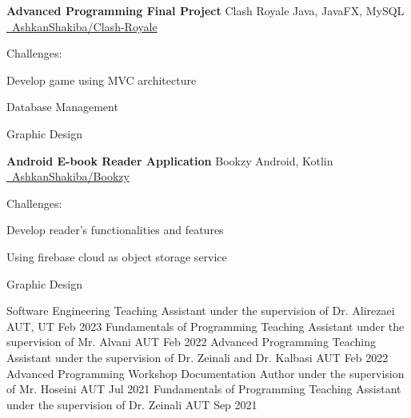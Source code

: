 \documentclass[]{awesome-cv}
\begin{document}
\begin{cventries}
	\vspace{0mm}
	\cventry
	{\textbf{Advanced Programming Final Project}}
	{Clash Royale}
	{Java, JavaFX, MySQL}
	{\href{https://github.com/AshkanShakiba/Clash-Royale}{\faGithub\ AshkanShakiba/Clash-Royale}}
	{\begin{cvitems}
		\vspace{1mm}
		\item[] {\hspace{-9mm} Challenges:}
		\vspace{1mm}
		\item {Develop game using MVC architecture}
		\vspace{1mm}
		\item {Database Management}
		\vspace{1mm}
		\item {Graphic Design}
	\end{cvitems}}
	\vspace{0mm}
	\cventry
	{\textbf{Android E-book Reader Application}}
	{Bookzy}
	{Android, Kotlin}
	{\href{https://github.com/maryam-kermanshahani2001/Bookzy}{\faGithub\ AshkanShakiba/Bookzy}}
	{\begin{cvitems}
		\vspace{1mm}
		\item[] {\hspace{-9mm} Challenges:}
		\vspace{1mm}
		\item {Develop reader's functionalities and features}
		\vspace{1mm}
		\item {Using firebase cloud as object storage service}
		\vspace{1mm}
		\item {Graphic Design}
	\end{cvitems}}
	\vspace{-3mm}
\end{cventries}
\vspace{2mm}
\begin{cvhonors}
	\cvhonor
	{Software Engineering}
	{Teaching Assistant under the supervision of Dr. Alirezaei}
	{AUT, UT}
	{Feb 2023}
	\cvhonor
	{Fundamentals of Programming}
	{Teaching Assistant under the supervision of Mr. Alvani}
	{AUT}
	{Feb 2022}
	\cvhonor
	{Advanced Programming}
	{Teaching Assistant under the supervision of Dr. Zeinali and Dr. Kalbasi}
	{AUT}
	{Feb 2022}
	\cvhonor
	{Advanced Programming}
	{Workshop Documentation Author under the supervision of Mr. Hoseini}
	{AUT}
	{Jul 2021}
	\cvhonor
	{Fundamentals of Programming}
	{Teaching Assistant under the supervision of Dr. Zeinali}
	{AUT}
	{Sep 2021}
\end{cvhonors}
\end{document}
